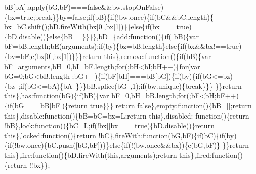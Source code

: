 \begin{DoxyCode}
      bB[bA].apply(bG,bF)===\textcolor{keyword}{false}&&bw.stopOnFalse)\{bx=\textcolor{keyword}{true};\textcolor{keywordflow}{break}\}\}by=\textcolor{keyword}{false};\textcolor{keywordflow}{if}(bB)\{\textcolor{keywordflow}{if}(!bw.once)\{\textcolor{keywordflow}{if}(bC&&bC.length)\{
      bx=bC.shift();bD.fireWith(bx[0],bx[1])\}\}\textcolor{keywordflow}{else}\{\textcolor{keywordflow}{if}(bx===\textcolor{keyword}{true})\{bD.disable()\}\textcolor{keywordflow}{else}\{bB=[]\}\}\}\},bD=\{add:\textcolor{keyword}{function}()\{\textcolor{keywordflow}{if}(
      bB)\{var bF=bB.length;bE(arguments);\textcolor{keywordflow}{if}(by)\{bz=bB.length\}\textcolor{keywordflow}{else}\{\textcolor{keywordflow}{if}(bx&&bx!==\textcolor{keyword}{true})\{bv=bF;e(bx[0],bx[1])\}\}\}\textcolor{keywordflow}{return} \textcolor{keyword}{
      this}\},\textcolor{keyword}{remove}:\textcolor{keyword}{function}()\{\textcolor{keywordflow}{if}(bB)\{var bF=arguments,bH=0,bI=bF.length;\textcolor{keywordflow}{for}(;bH<bI;bH++)\{\textcolor{keywordflow}{for}(var bG=0;bG<bB.length
      ;bG++)\{\textcolor{keywordflow}{if}(bF[bH]===bB[bG])\{\textcolor{keywordflow}{if}(by)\{\textcolor{keywordflow}{if}(bG<=bz)\{bz--;\textcolor{keywordflow}{if}(bG<=bA)\{bA--\}\}\}bB.splice(bG--,1);\textcolor{keywordflow}{if}(bw.unique)\{\textcolor{keywordflow}{break}\}\}\}
      \}\}\textcolor{keywordflow}{return} \textcolor{keyword}{this}\},has:\textcolor{keyword}{function}(bG)\{\textcolor{keywordflow}{if}(bB)\{var bF=0,bH=bB.length;\textcolor{keywordflow}{for}(;bF<bH;bF++)\{\textcolor{keywordflow}{if}(bG===bB[bF])\{\textcolor{keywordflow}{return} \textcolor{keyword}{true}\}\}\}\textcolor{keywordflow}{
      return} \textcolor{keyword}{false}\},empty:\textcolor{keyword}{function}()\{bB=[];\textcolor{keywordflow}{return} \textcolor{keyword}{this}\},disable:\textcolor{keyword}{function}()\{bB=bC=bx=L;\textcolor{keywordflow}{return} \textcolor{keyword}{this}\},disabled:\textcolor{keyword}{
      function}()\{\textcolor{keywordflow}{return} !bB\},lock:\textcolor{keyword}{function}()\{bC=L;\textcolor{keywordflow}{if}(!bx||bx===\textcolor{keyword}{true})\{bD.disable()\}\textcolor{keywordflow}{return} \textcolor{keyword}{this}\},locked:\textcolor{keyword}{function}()\{\textcolor{keywordflow}{return} 
      !bC\},fireWith:\textcolor{keyword}{function}(bG,bF)\{\textcolor{keywordflow}{if}(bC)\{\textcolor{keywordflow}{if}(by)\{\textcolor{keywordflow}{if}(!bw.once)\{bC.push([bG,bF])\}\}\textcolor{keywordflow}{else}\{\textcolor{keywordflow}{if}(!(bw.once&&bx))\{e(bG,bF)\}
      \}\}\textcolor{keywordflow}{return} \textcolor{keyword}{this}\},fire:\textcolor{keyword}{function}()\{bD.fireWith(\textcolor{keyword}{this},arguments);\textcolor{keywordflow}{return} \textcolor{keyword}{this}\},fired:\textcolor{keyword}{function}()\{\textcolor{keywordflow}{return} !!bx\}\};\textcolor{keywordflow}{
}
\end{DoxyCode}
